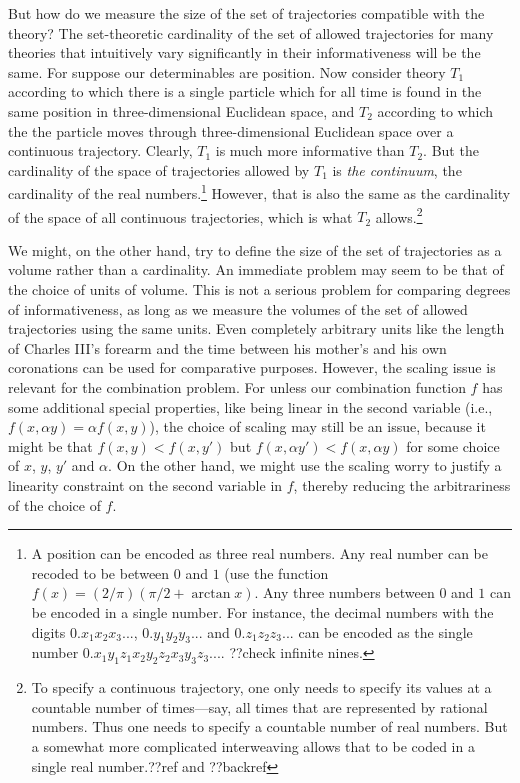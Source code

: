 But how do we measure the size of the set of trajectories compatible with the theory? The set-theoretic cardinality of the set of allowed
trajectories for many theories that intuitively vary significantly in their informativeness will be the same. For suppose our determinables
are position. Now consider theory $T_1$ according to which there is a single particle which for all time is found in the same position
in three-dimensional Euclidean space, and $T_2$ according to which the the particle moves through three-dimensional Euclidean space over
a continuous trajectory. Clearly, $T_1$ is much more informative than $T_2$. But the cardinality of the space of trajectories allowed by
$T_1$ is \textit{the continuum}, the cardinality of the real numbers.\footnote{A position can be encoded as three real numbers. Any real
number can be recoded to be between $0$ and $1$ (use the function $f(x)=(2/\pi)(\pi/2 + \arctan x)$. Any three numbers between $0$ and
$1$ can be encoded in a single number. For instance, the decimal numbers with the digits $0.x_1x_2x_3...$, $0.y_1y_2y_3...$ and 
$0.z_1z_2z_3...$ can be encoded as the single number $0.x_1y_1z_1x_2y_2z_2x_3y_3z_3...$. ??check infinite nines.} However, that is also
the same as the cardinality of the space of all continuous trajectories, which is what $T_2$ allows.\footnote{To specify a continuous
trajectory, one only needs to specify its values at a countable number of times---say, all times that are represented by rational 
numbers. Thus one needs to specify a countable number of real numbers. But a somewhat more complicated interweaving allows that to be
coded in a single real number.??ref and ??backref}

We might, on the other hand, try to define the size of the set of trajectories as a volume rather than a cardinality. 
An immediate problem may seem to be that of the choice of units of volume. This is not a serious problem for comparing
degrees of informativeness,  as long as we measure the volumes of the set of allowed trajectories using the 
same units. Even completely arbitrary units like the length of Charles III's forearm and the time between his mother's
and his own coronations can be used for comparative purposes. However, the scaling issue is relevant for the combination
problem. For unless our combination function $f$ has some additional special properties, like being linear in the second variable
(i.e., $f(x,\alpha y)=\alpha f(x,y)$), the choice of scaling may still be an issue, because it might be that $f(x,y)<f(x,y')$ but 
$f(x,\alpha y')<f(x,\alpha y)$ for some choice of $x$, $y$, $y'$ and $\alpha$. On the other hand, we might use the scaling worry
to justify a linearity constraint on the second variable in $f$, thereby reducing the arbitrariness of the choice of $f$.

